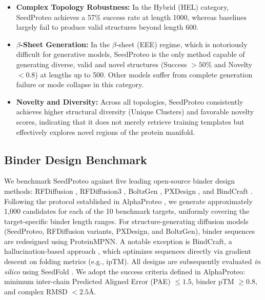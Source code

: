 \begin{itemize}
    \item \textbf{Complex Topology Robustness:} In the Hybrid (HEL) category, SeedProteo achieves a 57\% success rate at length 1000, whereas baselines largely fail to produce valid structures beyond length 600.
    
    \item \textbf{$\beta$-Sheet Generation:} In the $\beta$-sheet (EEE) regime, which is notoriously difficult for generative models, SeedProteo is the only method capable of generating diverse, valid and novel structures (Success $>50\%$ and Novelty $<0.8$) at lengths up to 500. Other models suffer from complete generation failure or mode collapse in this category.
    
    \item \textbf{Novelty and Diversity:} Across all topologies, SeedProteo consistently achieves higher structural diversity (Unique Clusters) and favorable novelty scores, indicating that it does not merely retrieve training templates but effectively explores novel regions of the protein manifold.
\end{itemize}

\subsection{Binder Design Benchmark}
We benchmark SeedProteo against five leading open-source binder design methods: RFDiffusion \cite{watsonNovoDesignProtein2023}, RFDiffusion3 \cite{butcher2025novo}, BoltzGen \cite{starkUniversalBinderDesign}, PXDesign \cite{ren2025pxdesign}, and BindCraft \cite{pacesaOneshotDesignFunctional2025}. Following the protocol established in AlphaProteo \cite{zambaldi2024novo}, we generate approximately 1,000 candidates for each of the 10 benchmark targets, uniformly covering the target-specific binder length ranges. For structure-generating diffusion models (SeedProteo, RFDiffusion variants, PXDesign, and BoltzGen), binder sequences are redesigned using ProteinMPNN. A notable exception is BindCraft, a hallucination-based approach \cite{anishchenkoNovoProteinDesign2021}, which optimizes sequences directly via gradient descent on folding metrics (e.g., ipTM). All designs are subsequently evaluated \textit{in silico} using SeedFold \cite{seedfold}. We adopt the success criteria defined in AlphaProteo: minimum inter-chain Predicted Aligned Error (PAE) $\le 1.5$, binder pTM $\ge0.8$, and complex RMSD $<2.5$\AA.

